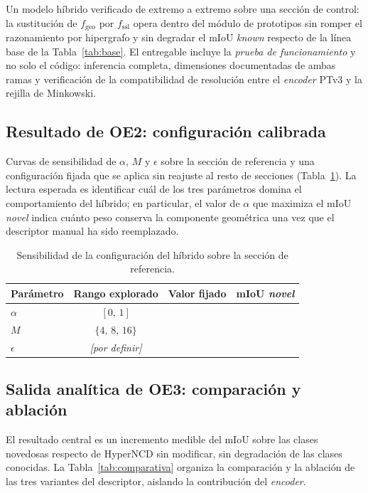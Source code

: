 Un modelo híbrido verificado de extremo a extremo sobre una sección de control:
la sustitución de $f_{\mathrm{geo}}$ por $f_{\mathrm{ssl}}$ opera dentro del
módulo de prototipos sin romper el razonamiento por hipergrafo y sin degradar el
mIoU \emph{known} respecto de la línea base de la Tabla~\ref{tab:base}. El
entregable incluye la \emph{prueba de funcionamiento} y no solo el código:
inferencia completa, dimensiones documentadas de ambas ramas y verificación de la
compatibilidad de resolución entre el \emph{encoder} PTv3 y la rejilla de
Minkowski.

\subsection{Resultado de OE2: configuración calibrada}

Curvas de sensibilidad de $\alpha$, $M$ y $\epsilon$ sobre la sección de
referencia y una configuración fijada que se aplica sin reajuste al resto de
secciones (Tabla~\ref{tab:sensibilidad}). La lectura esperada es identificar cuál
de los tres parámetros domina el comportamiento del híbrido; en particular, el
valor de $\alpha$ que maximiza el mIoU \emph{novel} indica cuánto peso conserva
la componente geométrica una vez que el descriptor manual ha sido reemplazado.

\begin{table}[H]
\centering
\caption{Sensibilidad de la configuración del híbrido sobre la sección de
referencia.}
\label{tab:sensibilidad}
\begin{tabular}{@{}lccc@{}}
\toprule
\textbf{Parámetro} & \textbf{Rango explorado} & \textbf{Valor fijado} & \textbf{mIoU \emph{novel}} \\
\midrule
$\alpha$   & $[0,\,1]$            & & \\
$M$        & $\{4,\,8,\,16\}$     & & \\
$\epsilon$ & \emph{[por definir]} & & \\
\bottomrule
\end{tabular}
\end{table}

\subsection{Salida analítica de OE3: comparación y ablación}

El resultado central es un incremento medible del mIoU sobre las clases novedosas
respecto de HyperNCD sin modificar, sin degradación de las clases conocidas. La
Tabla~\ref{tab:comparativa} organiza la comparación y la ablación de las tres
variantes del descriptor, aislando la contribución del \emph{encoder}.

